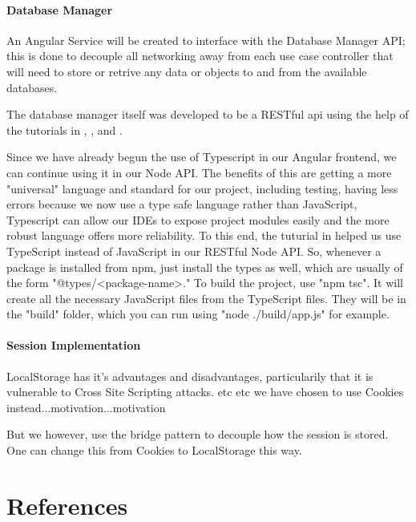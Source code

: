 \documentclass[11pt]{article}
\begin{document}
\paragraph{Database Manager}
An Angular Service will be created to interface with the Database Manager API; this is done to decouple all networking away from each use case controller that will need to store or retrive any data or objects to and from the available databases.\par
The database manager itself was developed to be a RESTful api using the help of the tutorials in \cite{Website:6}, \cite{Website:7}, and \cite{Website:8}.\par
Since we have already begun the use of Typescript in our Angular frontend, we can continue using it in our Node API. The benefits of this are getting a more "universal" language and standard for our project, including testing, having less errors because we now use a type safe language rather than JavaScript, Typescript can allow our IDEs to expose project modules easily and the more robust language offers more reliability\cite{Website:9}. To this end, the tuturial in \cite{Website:9} helped us use TypeScript instead of JavaScript in our RESTful Node API. So, whenever a package is installed from npm, just install the types as well, which are usually of the form "@types/<package-name>." To build the project, use "npm tsc". It will create all the necessary JavaScript files from the TypeScript files. They will be in the "build" folder, which you can run using "node ./build/app.js" for example.

\paragraph{Session Implementation}
LocalStorage has it's advantages and disadvantages, particularily that it is vulnerable to Cross Site Scripting attacks. etc etc we have chosen to use Cookies instead...motivation...motivation\par

But we however, use the bridge pattern to decouple how the session is stored. One can change this from Cookies to LocalStorage this way.

\section{References}


\end{document}

